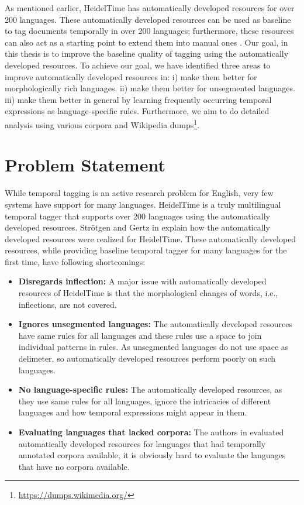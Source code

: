 As mentioned earlier, HeidelTime has automatically developed resources for over 200 languages. These automatically developed resources can be used as baseline to tag documents temporally in over 200 languages; furthermore, these resources can also act as a starting point to extend them into manual ones \cite{DBLP:conf/emnlp/StrotgenG15}. Our goal, in this thesis is to improve the baseline quality of tagging using the automatically developed resources. To achieve our goal, we have identified three areas to improve automatically developed resources in: i) make them better for morphologically rich languages. ii) make them better for unsegmented languages. iii) make them better in general by learning frequently occurring temporal expressions as language-specific rules.  Furthermore, we aim to do detailed analysis using various corpora and Wikipedia dumps\footnote{\url{https://dumps.wikimedia.org/}}.

\section{Problem Statement}
While temporal tagging is an active research problem for English, very few systems have support for many languages. HeidelTime is a truly multilingual temporal tagger that supports over 200 languages using the automatically developed resources. Str{\"{o}}tgen and Gertz in \cite{DBLP:conf/emnlp/StrotgenG15} explain how the automatically developed resources were realized for HeidelTime. These automatically developed resources, while providing baseline temporal tagger for many languages for the first time, have following shortcomings:
\begin{itemize}
	\item \textbf{Disregards inflection:} A major issue with automatically developed resources of HeidelTime is that the morphological changes of words, i.e., inflections, are not covered.
	\item \textbf{Ignores unsegmented languages:} The automatically developed resources have same rules for all languages and these rules use a space to join individual patterns in rules. As unsegmented languages do not use space as delimeter, so automatically developed resources perform poorly on such languages. 
	\item \textbf{No language-specific rules:} The automatically developed resources, as they use same rules for all languages, ignore the intricacies of different languages and how temporal expressions might appear in them. 
	\item \textbf{Evaluating languages that lacked corpora:} The authors in \cite{DBLP:conf/emnlp/StrotgenG15} evaluated automatically developed resources for languages that had temporally annotated corpora available, it is obviously hard to evaluate the languages that have no corpora available. 
\end{itemize}

